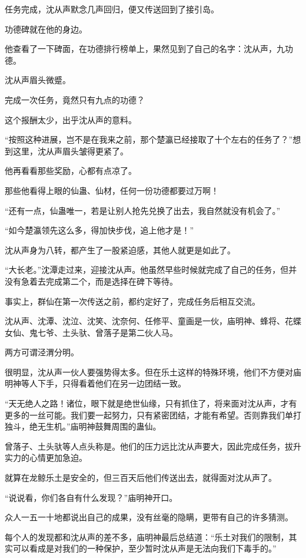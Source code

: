 
\begin{this_body}

任务完成，沈从声默念几声回归，便又传送回到了接引岛。

功德碑就在他的身边。

他查看了一下碑面，在功德排行榜单上，果然见到了自己的名字：沈从声，九功德。

沈从声眉头微蹙。

完成一次任务，竟然只有九点的功德？

这个报酬太少，出乎沈从声的意料。

“按照这种进展，岂不是在我来之前，那个楚瀛已经接取了十个左右的任务了？”想到这里，沈从声眉头皱得更紧了。

他再看看那些奖励，心都有点凉了。

那些他看得上眼的仙蛊、仙材，任何一份功德都要过万啊！

“还有一点，仙蛊唯一，若是让别人抢先兑换了出去，我自然就没有机会了。”

“如今楚瀛领先这么多，得加快步伐，追上他才是！”

沈从声身为八转，都产生了一股紧迫感，其他人就更是如此了。

“大长老。”沈潭走过来，迎接沈从声。他虽然早些时候就完成了自己的任务，但并没有急着去完成第二个，而是选择在碑下等待。

事实上，群仙在第一次传送之前，都约定好了，完成任务后相互交流。

沈从声、沈潭、沈泣、沈笑、沈奈何、任修平、童画是一伙，庙明神、蜂将、花蝶女仙、鬼七爷、土头驮、曾落子是第二伙人马。

两方可谓泾渭分明。

很明显，沈从声一伙人要强势得太多。但在乐土这样的特殊环境，他们不方便对庙明神等人下手，只得看着他们在另一边团结一致。

“天无绝人之路！诸位，眼下就是绝世仙缘，只有抓住了，将来面对沈从声，才有更多的一丝可能。我们要一起努力，只有紧密团结，才能有希望。否则靠我们单打独斗，绝无生机。”庙明神鼓舞周围的蛊仙。

曾落子、土头驮等人点头称是。他们的压力远比沈从声要大，因此完成任务，拔升实力的心情更加急迫。

就算在龙鲸乐土是安全的，但三百天后他们传送出去，就得面对沈从声了。

“说说看，你们各自有什么发现？”庙明神开口。

众人一五一十地都说出自己的成果，没有丝毫的隐瞒，更带有自己的许多猜测。

每个人的发现都和沈从声的差不多，庙明神最后总结道：“乐土对我们的限制，其实可以看成是对我们的一种保护，至少暂时沈从声是无法向我们下毒手的。”


\end{this_body}
